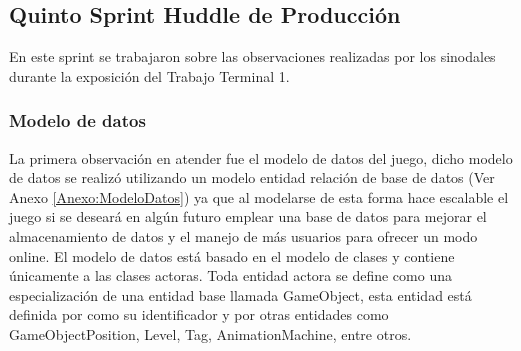 \subsection{Quinto Sprint Huddle de Producción}
En este sprint se trabajaron sobre las observaciones realizadas por los sinodales 
durante la exposición del Trabajo Terminal 1. 

\subsubsection{Modelo de datos}
La primera observación en atender fue el modelo de datos del juego, dicho modelo 
de datos se realizó utilizando un modelo entidad relación de base de datos (Ver 
Anexo \ref{Anexo:ModeloDatos}) ya que al modelarse de esta forma hace escalable 
el juego si se deseará en algún futuro emplear una base de datos para mejorar 
el almacenamiento de datos y el manejo de más usuarios para ofrecer un modo 
online. El modelo de datos está basado en el modelo de clases y contiene 
únicamente a las clases actoras. Toda entidad actora se define como una 
especialización de una entidad base llamada GameObject, esta entidad está 
definida por como su identificador y por otras entidades como GameObjectPosition, 
Level, Tag, AnimationMachine, entre otros. 

